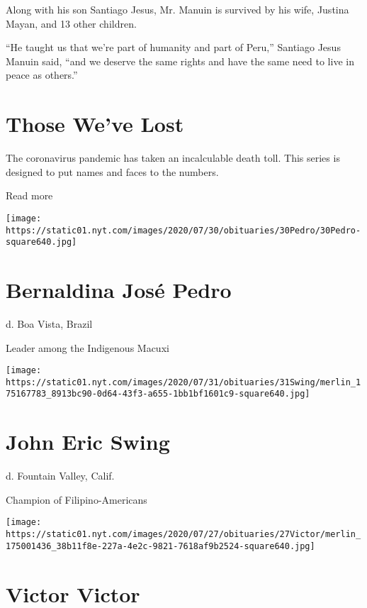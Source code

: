 Along with his son Santiago Jesus, Mr. Manuin is survived by his wife,
Justina Mayan, and 13 other children.

``He taught us that we're part of humanity and part of Peru,'' Santiago
Jesus Manuin said, ``and we deserve the same rights and have the same
need to live in peace as others.''

\href{https://www.nytimes.com/interactive/2020/obituaries/people-died-coronavirus-obituaries.html?action=click\&pgtype=Article\&state=default\&region=BELOW_MAIN_CONTENT\&context=covid_obits_promo}{}

\hypertarget{those-weve-lost}{%
\section{Those We've Lost}\label{those-weve-lost}}

The coronavirus pandemic has taken an incalculable death toll. This
series is designed to put names and faces to the numbers.

Read more

\texttt{[image: https://static01.nyt.com/images/2020/07/30/obituaries/30Pedro/30Pedro-square640.jpg]}

\hypertarget{bernaldina-josuxe9-pedro}{%
\section{Bernaldina José Pedro}\label{bernaldina-josuxe9-pedro}}

d. Boa Vista, Brazil

Leader among the Indigenous Macuxi

\texttt{[image: https://static01.nyt.com/images/2020/07/31/obituaries/31Swing/merlin\_175167783\_8913bc90-0d64-43f3-a655-1bb1bf1601c9-square640.jpg]}

\hypertarget{john-eric-swing}{%
\section{John Eric Swing}\label{john-eric-swing}}

d. Fountain Valley, Calif.

Champion of Filipino-Americans

\texttt{[image: https://static01.nyt.com/images/2020/07/27/obituaries/27Victor/merlin\_175001436\_38b11f8e-227a-4e2c-9821-7618af9b2524-square640.jpg]}

\hypertarget{victor-victor}{%
\section{Victor Victor}\label{victor-victor}}

